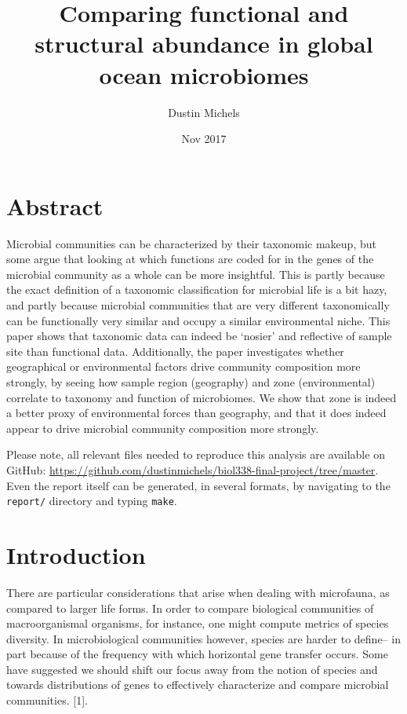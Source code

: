 \documentclass[12pt,a4paper,]{article}
\title{Comparing functional and structural abundance in global ocean
microbiomes}
\author{Dustin Michels}
\date{Nov 2017}
\begin{document}
\maketitle

\section{Abstract}\label{abstract}

Microbial communities can be characterized by their taxonomic makeup,
but some argue that looking at which functions are coded for in the
genes of the microbial community as a whole can be more insightful. This
is partly because the exact definition of a taxonomic classification for
microbial life is a bit hazy, and partly because microbial communities
that are very different taxonomically can be functionally very similar
and occupy a similar environmental niche. This paper shows that
taxonomic data can indeed be `nosier' and reflective of sample site than
functional data. Additionally, the paper investigates whether
geographical or environmental factors drive community composition more
strongly, by seeing how sample region (geography) and zone
(environmental) correlate to taxonomy and function of microbiomes. We
show that zone is indeed a better proxy of environmental forces than
geography, and that it does indeed appear to drive microbial community
composition more strongly.

Please note, all relevant files needed to reproduce this analysis are
available on GitHub:
\url{https://github.com/dustinmichels/biol338-final-project/tree/master}.
Even the report itself can be generated, in several formats, by
navigating to the \texttt{report/} directory and typing \texttt{make}.

\section{Introduction}\label{introduction}

There are particular considerations that arise when dealing with
microfauna, as compared to larger life forms. In order to compare
biological communities of macroorganismal organisms, for instance, one
might compute metrics of species diversity. In microbiological
communities however, species are harder to define-- in part because of
the frequency with which horizontal gene transfer occurs. Some have
suggested we should shift our focus away from the notion of species and
towards distributions of genes to effectively characterize and compare
microbial communities. {[}1{]}.
\end{document}
